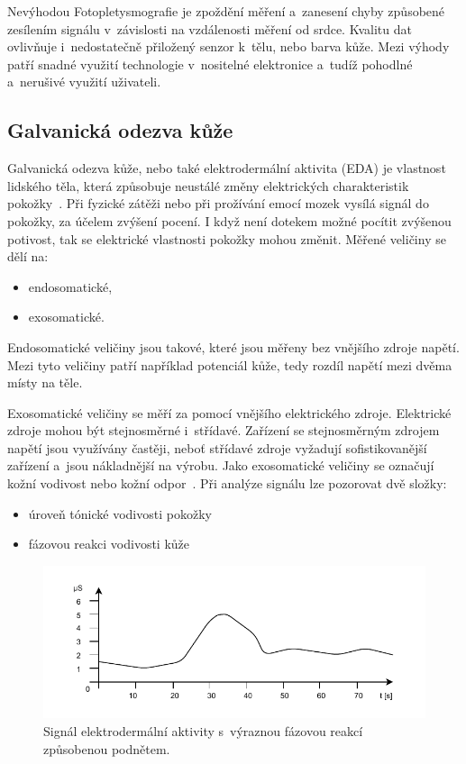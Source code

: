          Nevýhodou Fotopletysmografie je zpoždění měření a~zanesení chyby způsobené zesílením signálu v~závislosti na vzdálenosti měření od srdce. Kvalitu dat ovlivňuje i~nedostatečně přiložený senzor k~tělu, nebo barva kůže. Mezi výhody patří snadné využití technologie v~nositelné elektronice a~tudíž pohodlné a~nerušivé využití uživateli.
     
        
        \subsection{Galvanická odezva kůže}
        \label{gsr}
        Galvanická odezva kůže, nebo také elektrodermální aktivita (EDA) je vlastnost lidského těla, která způsobuje neustálé změny elektrických charakteristik pokožky~\cite{eda}. Při fyzické zátěži nebo při prožívání emocí mozek vysílá signál do pokožky, za účelem zvýšení pocení. I když není dotekem možné pocítit zvýšenou potivost, tak se elektrické vlastnosti pokožky mohou změnit. Měřené veličiny se dělí na:
        \begin{itemize}
            \item endosomatické,
            \item exosomatické.
        \end{itemize}

        Endosomatické veličiny jsou takové, které jsou měřeny bez vnějšího zdroje napětí. Mezi tyto veličiny patří například potenciál kůže, tedy rozdíl napětí mezi dvěma místy na těle. 
        
        Exosomatické veličiny se měří za pomocí vnějšího elektrického zdroje. Elektrické zdroje mohou být stejnosměrné i~střídavé. Zařízení se stejnosměrným zdrojem napětí jsou využívány častěji, neboť střídavé zdroje vyžadují sofistikovanější zařízení a~jsou nákladnější na výrobu. Jako exosomatické veličiny se označují kožní vodivost nebo kožní odpor~\cite{eda_book}. Při analýze signálu lze pozorovat dvě složky:
        \begin{itemize}
            \item úroveň tónické vodivosti pokožky
            \item fázovou reakci vodivosti kůže
        \end{itemize}  
        
        \begin{figure}[H]
            \centering
            \includegraphics[width=\textwidth]{obrazky-figures/Gsr.pdf}
            \caption{Signál elektrodermální aktivity s~výraznou fázovou reakcí způsobenou podnětem.}
            \label{fig:gsr_signal}
        \end{figure}
 
